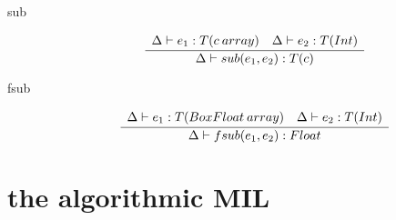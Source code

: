 \documentclass[12pt,twoside,fleqn]{amsart}
\theoremstyle{plain}
\theoremstyle{plain}
\theoremstyle{definition}
\begin{document}
\begin{description}
\item [sub]
\[
\frac{\begin{array}{lll}
\Delta  \vdash e_{1}  :T(c \: array)  & \Delta  \vdash e_{2}  :T(Int) 
\end{array} }{\Delta  \vdash sub(e_{1} ,e_{2} )  :T(c)  }\]

\item [fsub]
\[
\frac{\begin{array}{ll}
\Delta  \vdash e_{1}  :T(BoxFloat \: array)  & \Delta  \vdash e_{2}  :T(Int) 
\end{array} }{\Delta  \vdash fsub(e_{1} ,e_{2} )  :Float  }\]

\end{description}

\section{the algorithmic MIL}


\newcommand{\kindvalid}[2]{#1 \models #2 }

\newcommand{\kindsynth}[3]{#1 \models #2 \Uparrow #3 }

\newcommand{\subkind}[3]{#1 \models #2 \preceq #3 }

\newcommand{\conequiv}[4]{#1 \models #2 \equiv #3 ::#4 }

\newcommand{\coneq}[3]{\models }
 
\newcommand{\typevalid}[2]{#1 \models #2 }

\newcommand{\typev}[1]{\typevalid{\Delta }{#1 }}



\newcommand{\typesynth}[3]{#1 \models #2 \Uparrow #3 }

\newcommand{\types}[2]{\typesynth{\context }{#1 }{#2 }}

\newcommand{\typeequiv}[3]{#1 \models #2 \equiv #3 }

\newcommand{\typeeq}[2]{\typeequiv{\context }{#1 }{#2 }}

\newcommand{\hnf}[3]{#1 \models #2 \Longrightarrow #3 }

\newcommand{\Hnf}[2]{\hnf{\context }{#1 }{#2 }}

\newcommand{\pathextract}[3]{#1 \models #2 \leadsto #3 }

\newcommand{\pext}[2]{\pathextract{\context }{#1 }{#2 }}

\newcommand{\selfify}[3]{#1 ::#2 \doteq #3 }

\newcommand{\kcheck}[3]{#1 \models #2 \Downarrow #3 }

\newcommand{\betared}[3]{#1 \models #2 \rightarrow #3 }
\end{document}

